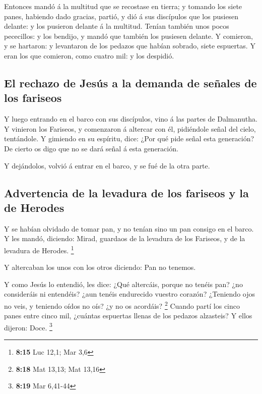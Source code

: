  Entonces mandó á la multitud que se recostase en tierra; y
tomando los siete panes, habiendo dado gracias, partió, y dió á sus
discípulos que los pusiesen delante: y los pusieron delante á la
multitud.  Tenían también unos pocos pececillos: y los
bendijo, y mandó que también los pusiesen delante.  Y
comieron, y se hartaron: y levantaron de los pedazos que habían sobrado,
siete espuertas.  Y eran los que comieron, como cuatro mil:
y los despidió.

\hypertarget{el-rechazo-de-jesuxfas-a-la-demanda-de-seuxf1ales-de-los-fariseos}{%
\subsection{El rechazo de Jesús a la demanda de señales de los
fariseos}\label{el-rechazo-de-jesuxfas-a-la-demanda-de-seuxf1ales-de-los-fariseos}}

 Y luego entrando en el barco con sus discípulos, vino á
las partes de Dalmanutha.  Y vinieron los Fariseos, y
comenzaron á altercar con él, pidiéndole señal del cielo, tentándole.
 Y gimiendo en su espíritu, dice: ¿Por qué pide señal esta
generación? De cierto os digo que no se dará señal á esta generación.

 Y dejándolos, volvió á entrar en el barco, y se fué de la
otra parte.

\hypertarget{advertencia-de-la-levadura-de-los-fariseos-y-la-de-herodes}{%
\subsection{Advertencia de la levadura de los fariseos y la de
Herodes}\label{advertencia-de-la-levadura-de-los-fariseos-y-la-de-herodes}}

 Y se habían olvidado de tomar pan, y no tenían sino un pan
consigo en el barco.  Y les mandó, diciendo: Mirad,
guardaos de la levadura de los Fariseos, y de la levadura de Herodes.
\footnote{\textbf{8:15} Luc 12,1; Mar 3,6}

 Y altercaban los unos con los otros diciendo: Pan no
tenemos.

 Y como Jesús lo entendió, les dice: ¿Qué altercáis, porque
no tenéis pan? ¿no consideráis ni entendéis? ¿aun tenéis endurecido
vuestro corazón?  ¿Teniendo ojos no veis, y teniendo oídos
no oís? ¿y no os acordáis? \footnote{\textbf{8:18} Mat 13,13; Mat 13,16}
 Cuando partí los cinco panes entre cinco mil, ¿cuántas
espuertas llenas de los pedazos alzasteis? Y ellos dijeron: Doce.
\footnote{\textbf{8:19} Mar 6,41-44}


